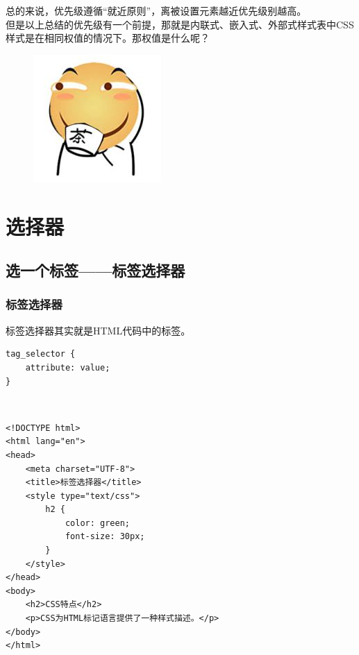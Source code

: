 总的来说，优先级遵循“就近原则”，离被设置元素越近优先级别越高。\\

但是以上总结的优先级有一个前提，那就是内联式、嵌入式、外部式样式表中CSS样式是在相同权值的情况下。那权值是什么呢？

\begin{figure}[H]
	\centering
	\includegraphics[]{img/C5/5-5/1.png}
\end{figure}

\newpage

\chapter{选择器}

\section{选一个标签——标签选择器}

\subsection{标签选择器}

标签选择器其实就是HTML代码中的标签。\\

\begin{lstlisting}[style=htmlcssjs]
tag_selector {
    attribute: value;
}
\end{lstlisting}

\vspace{0.5cm}

\\

\begin{lstlisting}[style=htmlcssjs]
<!DOCTYPE html>
<html lang="en">
<head>
    <meta charset="UTF-8">
    <title>标签选择器</title>
    <style type="text/css">
        h2 {
            color: green;
            font-size: 30px;
        }
    </style>
</head>
<body>
    <h2>CSS特点</h2>
    <p>CSS为HTML标记语言提供了一种样式描述。</p>
</body>
</html>
\end{lstlisting}

